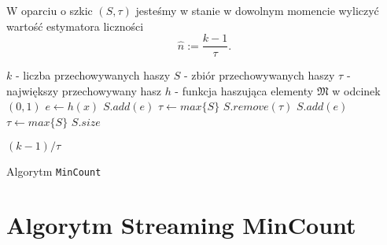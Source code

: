W oparciu o szkic $(S, {\tau})$ jesteśmy w stanie w dowolnym momencie wyliczyć wartość estymatora liczności $$\hat{n} := \frac{k - 1}{{\tau}}.$$

\begin{algorithm}
    \begin{algorithmic}
    \State $k$ -  liczba przechowywanych haszy 
    \State $S  $ - zbiór przechowywanych haszy
    \State $\tau  $ - największy przechowywany hasz 
    \State $h  $ - funkcja haszująca elementy $\mathfrak{M}$ w odcinek $(0, 1)$
    \newline
        \State $e \gets h(x)$
                \State $S.add(e)$
                \State $\tau \gets max\{S\}$
                \State $S.remove(\tau)$
                \State $S.add(e)$
                \State $\tau \gets max\{S\}$
            \EndIf
        \EndIf
    \EndFunction
    \newline
            \State \Return $S.size$
        
        \Else 
            \State \Return $(k - 1) / \tau$
        \EndIf
    \EndFunction
    
    \end{algorithmic}
    \caption{Algorytm \texttt{MinCount}}
\end{algorithm}

\newpage

\section{Algorytm Streaming MinCount}

